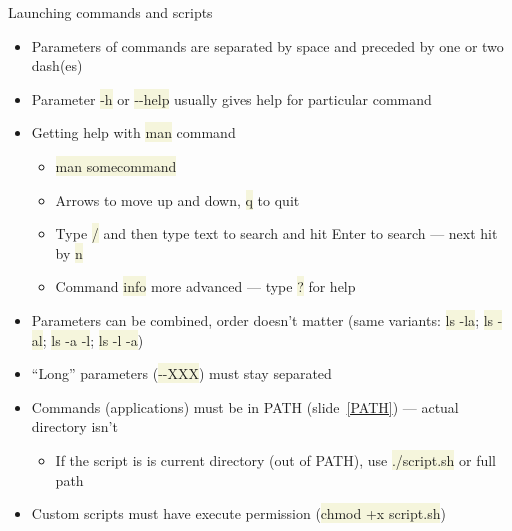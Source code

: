 \documentclass[compress, ucs, xelatex, 11pt, xcolor=svgnames, aspectratio=169,
	hyperref={
		bookmarks=true,
		unicode=true,
		colorlinks=true,
		pdftitle={Linux, command line and MetaCentrum},
		plainpages=false,
		pdfauthor={Vojtech Zeisek},
		pdfsubject={Course about use of Linux command line, writing shell scripts and using MetaCentrum of CESNET},
		pdfcreator={XeLaTeX},
		pdfkeywords={Linux, GNU, BASH, shell, command line, MetaCentrum},
		linkcolor=DarkRed, %
		anchorcolor=DarkBlue, %
		citecolor=Indigo, %
		filecolor=NavyBlue, %
		menucolor=DarkMagenta, %
		urlcolor=DarkBlue, %
		pdftex},
	url={hyphens, lowtilde} %
	]{beamer}
\renewcommand{\texttt}[1]{\colorbox{Beige}{{\ttfamily #1}}}
\begin{document}
\begin{frame}{Launching commands and scripts}
	\begin{itemize}
		\item Parameters of commands are separated by space and preceded by one or two dash(es)
		\item Parameter \texttt{-h} or \texttt{-{-}help} usually gives help for particular command
		\item Getting help with \texttt{man} command
		\begin{itemize}
			\item \texttt{man somecommand}
			\item Arrows to move up and down, \texttt{q} to quit
			\item Type \texttt{/} and then type text to search and hit Enter to search --- next hit by \texttt{n}
			\item Command \texttt{info} more advanced --- type \texttt{?} for help
		\end{itemize}
		\item Parameters can be combined, order doesn't matter (same variants: \texttt{ls -la}; \texttt{ls -al}; \texttt{ls -a -l}; \texttt{ls -l -a})
		\item \enquote{Long} parameters (\texttt{-{-}XXX}) must stay separated
		\item Commands (applications) must be in PATH (slide~\ref{PATH}) --- actual directory isn't
		\begin{itemize}
			\item If the script is is current directory (out of PATH), use \texttt{./script.sh} or full path
		\end{itemize}
		\item Custom scripts must have execute permission (\texttt{chmod +x script.sh})
	\end{itemize}
\end{frame}
\end{document}
